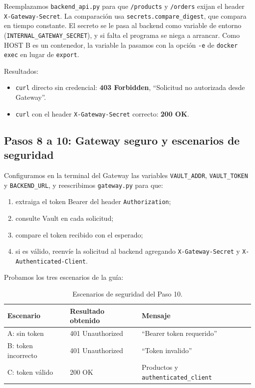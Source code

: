 \documentclass[11pt,a4paper]{article}
\begin{document}
Reemplazamos \texttt{backend\_api.py} para que \texttt{/products} y \texttt{/orders} exijan el header \texttt{X-Gateway-Secret}. La comparación usa \texttt{secrets.compare\_digest}, que compara en tiempo constante. El secreto se le pasa al backend como variable de entorno (\texttt{INTERNAL\_GATEWAY\_SECRET}), y si falta el programa se niega a arrancar. Como HOST B es un contenedor, la variable la pasamos con la opción \texttt{-e} de \texttt{docker exec} en lugar de \texttt{export}.

Resultados:
\begin{itemize}[noitemsep]
  \item \texttt{curl} directo sin credencial: \textbf{403 Forbidden}, ``Solicitud no autorizada desde Gateway''.
  \item \texttt{curl} con el header \texttt{X-Gateway-Secret} correcto: \textbf{200 OK}.
\end{itemize}

\subsection{Pasos 8 a 10: Gateway seguro y escenarios de seguridad}

Configuramos en la terminal del Gateway las variables \texttt{VAULT\_ADDR}, \texttt{VAULT\_TOKEN} y \texttt{BACKEND\_URL}, y reescribimos \texttt{gateway.py} para que:
\begin{enumerate}[noitemsep]
  \item extraiga el token Bearer del header \texttt{Authorization};
  \item consulte Vault en cada solicitud;
  \item compare el token recibido con el esperado;
  \item si es válido, reenvíe la solicitud al backend agregando \texttt{X-Gateway-Secret} y \texttt{X-Authenticated-Client}.
\end{enumerate}

Probamos los tres escenarios de la guía:

\begin{table}[h]
\centering
\begin{tabular}{@{}lll@{}}
\toprule
\textbf{Escenario} & \textbf{Resultado obtenido} & \textbf{Mensaje} \\
\midrule
A: sin token & 401 Unauthorized & ``Bearer token requerido'' \\
B: token incorrecto & 401 Unauthorized & ``Token invalido'' \\
C: token válido & 200 OK & Productos y \texttt{authenticated\_client} \\
\bottomrule
\end{tabular}
\caption{Escenarios de seguridad del Paso 10.}
\end{table}
\end{document}

